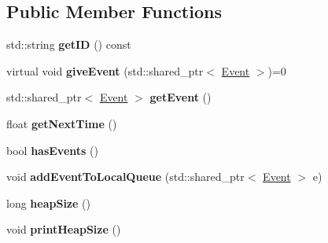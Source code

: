 \subsection*{\-Public \-Member \-Functions}
\begin{DoxyCompactItemize}
\item 
\hypertarget{classEventGenerator_a467b319c4317b83b9c16708c9815953d}{std\-::string {\bfseries get\-I\-D} () const }\label{classEventGenerator_a467b319c4317b83b9c16708c9815953d}

\item 
\hypertarget{classEventGenerator_a5d7d4625d7dc71a887cf39a144cc2efa}{virtual void {\bfseries give\-Event} (std\-::shared\-\_\-ptr$<$ \hyperlink{classEvent}{\-Event} $>$)=0}\label{classEventGenerator_a5d7d4625d7dc71a887cf39a144cc2efa}

\item 
\hypertarget{classEventGenerator_ab40fd3a0bf1aa974ba50feb443d81009}{std\-::shared\-\_\-ptr$<$ \hyperlink{classEvent}{\-Event} $>$ {\bfseries get\-Event} ()}\label{classEventGenerator_ab40fd3a0bf1aa974ba50feb443d81009}

\item 
\hypertarget{classEventGenerator_a20e80b412caa6e20244a111ad6e3a0c4}{float {\bfseries get\-Next\-Time} ()}\label{classEventGenerator_a20e80b412caa6e20244a111ad6e3a0c4}

\item 
\hypertarget{classEventGenerator_a1fd7fdcaa263115e89a9fc69b85eca22}{bool {\bfseries has\-Events} ()}\label{classEventGenerator_a1fd7fdcaa263115e89a9fc69b85eca22}

\item 
\hypertarget{classEventGenerator_a3487849484c9b521527d6acacee79e88}{void {\bfseries add\-Event\-To\-Local\-Queue} (std\-::shared\-\_\-ptr$<$ \hyperlink{classEvent}{\-Event} $>$ e)}\label{classEventGenerator_a3487849484c9b521527d6acacee79e88}

\item 
\hypertarget{classEventGenerator_a359bf18e456f0f6618c12c923cc65d1d}{long {\bfseries heap\-Size} ()}\label{classEventGenerator_a359bf18e456f0f6618c12c923cc65d1d}

\item 
\hypertarget{classEventGenerator_ac39a7ed01f67521ce0ccf2999bd4f7b4}{void {\bfseries print\-Heap\-Size} ()}\label{classEventGenerator_ac39a7ed01f67521ce0ccf2999bd4f7b4}

\end{DoxyCompactItemize}
